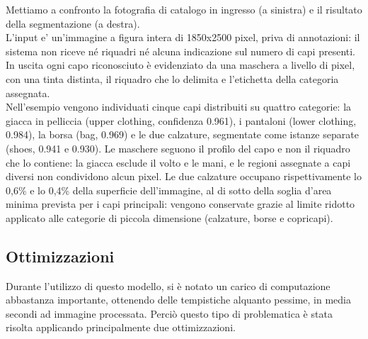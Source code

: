 \noindent
Mettiamo a confronto la fotografia di catalogo in ingresso (a sinistra) e il risultato della segmentazione (a destra). \\
\noindent
L'input e' un'immagine a figura intera di 1850x2500 pixel, priva di annotazioni:
il sistema non riceve né riquadri né alcuna indicazione sul numero di capi presenti.
In uscita ogni capo riconosciuto è evidenziato da una maschera a livello di pixel, con una tinta distinta,
il riquadro che lo delimita e l'etichetta della categoria assegnata. \\
\noindent
Nell'esempio vengono individuati cinque capi distribuiti su quattro categorie: la giacca in pelliccia (upper clothing, confidenza 0.961),
i pantaloni (lower clothing, 0.984), la borsa (bag, 0.969) e le due calzature, segmentate come istanze separate (shoes, 0.941 e 0.930).
Le maschere seguono il profilo del capo e non il riquadro che lo contiene: la giacca esclude il volto e le mani,
e le regioni assegnate a capi diversi non condividono alcun pixel.
Le due calzature occupano rispettivamente lo 0,6\% e lo 0,4\% della superficie dell'immagine,
al di sotto della soglia d'area minima prevista per i capi principali: vengono
conservate grazie al limite ridotto applicato alle categorie di piccola dimensione (calzature, borse e copricapi).

\newpage

\subsection{Ottimizzazioni}

Durante l'utilizzo di questo modello, si è notato un carico di computazione abbastanza importante,
ottenendo delle tempistiche alquanto pessime, in media secondi ad immagine processata.
Perciò questo tipo di problematica è stata risolta applicando principalmente due ottimizzazioni.

